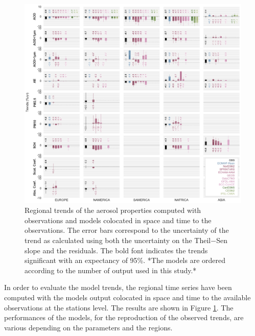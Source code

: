\documentclass[journal abbreviation, manuscript]{copernicus}
\begin{document}
\begin{figure}[t]
 \includegraphics[width=16cm]{../scripts/figs/heatmaps/BARS.png}
 \caption{Regional trends of the aerosol properties computed with observations and models colocated in space and time to the observations. The error bars correspond to the uncertainty of the trend as calculated using both the uncertainty on the Theil−Sen slope and the residuals. The bold font indicates the trends significant with an expectancy of 95\%. *The models are ordered according to the number of output used in this study.*}
 \label{fig:bars}
\end{figure}

In order to evaluate the model trends, the regional time series have been computed with the models output colocated in space and time to the available observations at the stations level. The results are shown in Figure \ref{fig:bars}. The performances of the models, for the reproduction of the observed trends, are various depending on the parameters and the regions.
\end{document}
